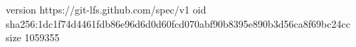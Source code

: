 version https://git-lfs.github.com/spec/v1
oid sha256:1dc1f74d4461fdb86e96d6d0d60fcd070abf90b8395e890b3d56ca8f69bc24cc
size 1059355

